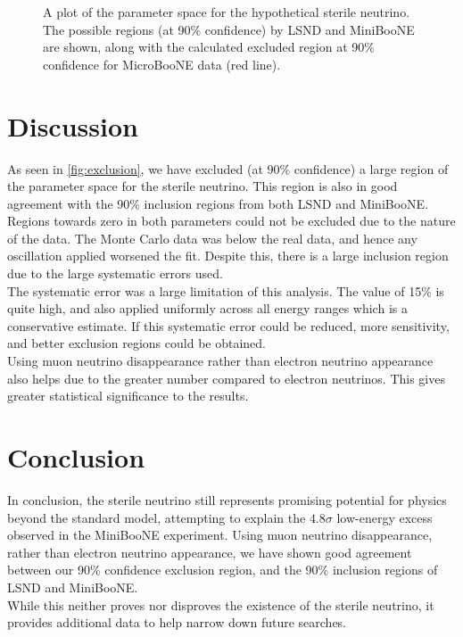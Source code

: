 \documentclass[reprint,
    nofootinbib,
    amsmath,amssymb,
    aps,
    10pt,
    nolongbibliography,
]{revtex4-2}
\begin{document}
\begin{figure}[H]
    \centering
       
    \caption{A plot of the parameter space for the hypothetical sterile neutrino. The possible
    regions (at 90\% confidence) by LSND and MiniBooNE are shown, along with the calculated
    excluded region at 90\% confidence for MicroBooNE data (red line).}
    \label{fig:exclusion}
\end{figure}

\section{Discussion}

As seen in \autoref{fig:exclusion}, we have excluded (at 90\% confidence) a large region of the
parameter space for the sterile neutrino. This region is also in good agreement with the 90\% inclusion
regions from both LSND and MiniBooNE. Regions towards zero in both parameters could not be excluded due
to the nature of the data. The Monte Carlo data was below the real data, and hence any oscillation
applied worsened the fit. Despite this, there is a large inclusion region due to the large systematic
errors used. \\

The systematic error was a large limitation of this analysis. The value of 15\%
is quite high, and also applied uniformly across all energy ranges which is a conservative
estimate. If this systematic error could be reduced, more sensitivity, and better exclusion regions
could be obtained. \\

Using muon neutrino disappearance rather than electron neutrino appearance also helps due to the greater
number compared to electron neutrinos. This gives greater statistical significance to the results.


\section{Conclusion}

In conclusion, the sterile neutrino still represents promising potential for physics beyond the
standard model, attempting to explain the $4.8\sigma$ low-energy excess observed in the MiniBooNE
experiment. Using muon neutrino disappearance, rather than electron neutrino appearance, we have
shown good agreement between our 90\% confidence exclusion region, and the 90\% inclusion regions of
LSND and MiniBooNE.\\

While this neither proves nor disproves the existence of the sterile neutrino, it provides
additional data to help narrow down future searches.


\end{document}
